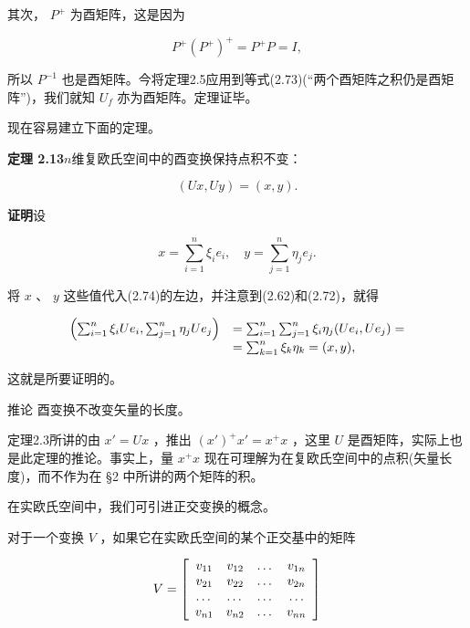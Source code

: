 其次， $P^{+}$ 为酉矩阵，这是因为

\begin{equation*}
P ^ {+} (P ^ {+}) ^ {+} = P ^ {+} P = I,
\end{equation*}

所以 $P^{-1}$ 也是酉矩阵。今将定理2.5应用到等式(2.73)(“两个酉矩阵之积仍是酉矩阵”)，我们就知 $U_{f}$ 亦为酉矩阵。定理证毕。

现在容易建立下面的定理。

\textbf{定理 2.13}\quad $n$维复欧氏空间中的酉变换保持点积不变：

\begin{equation*}
(U x, U y) = (x, y).\tag{2.74}
\end{equation*}

\textbf{证明}\quad 设

\begin{equation*}
x = \sum_ {i = 1} ^ {n} \xi_ {i} e _ {i}, \quad y = \sum_ {j = 1} ^ {n} \eta_ {j} e _ {j}.
\end{equation*}

将 $x$ 、 $y$ 这些值代入(2.74)的左边，并注意到(2.62)和(2.72)，就得

\begin{equation*}
\begin{array}{r l} \left(\sum_ {i = 1} ^ {n} \xi_ {i} U e _ {i}, \sum_ {j = 1} ^ {n} \eta_ {j} U e _ {j}\right) & = \sum_ {i = 1} ^ {n} \sum_ {j = 1} ^ {n} \xi_ {i} \eta_ {j} (U e _ {i}, U e _ {j}) = \\ & = \sum_ {k = 1} ^ {n} \xi_ {k} \eta_ {k} = (x, y), \end{array}
\end{equation*}

这就是所要证明的。

推论 酉变换不改变矢量的长度。

定理2.3所讲的由 $x' = Ux$ ，推出 $(x')^{+}x' = x^{+}x$ ，这里 $U$ 是酉矩阵，实际上也是此定理的推论。事实上，量 $x^{+}x$ 现在可理解为在复欧氏空间中的点积(矢量长度)，而不作为在 §2 中所讲的两个矩阵的积。

在实欧氏空间中，我们可引进正交变换的概念。

对于一个变换 $V$ ，如果它在实欧氏空间的某个正交基中的矩阵

\begin{equation*}
V = \left[ \begin{array}{c c c c} v _ {1 1} & v _ {1 2} & \dots & v _ {1 n} \\ v _ {2 1} & v _ {2 2} & \dots & v _ {2 n} \\ \dots & \dots & \dots & \dots \\ v _ {n 1} & v _ {n 2} & \dots & v _ {n n} \end{array} \right]
\end{equation*}

